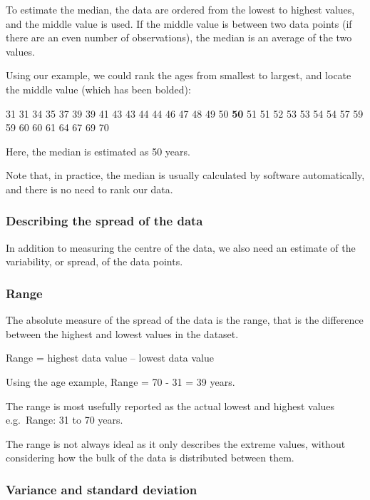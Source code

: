 \documentclass[
  a4paper,
]{memoir}
\begin{document}
To estimate the median, the data are ordered from the lowest to highest
values, and the middle value is used. If the middle value is between two
data points (if there are an even number of observations), the median is
an average of the two values.

Using our example, we could rank the ages from smallest to largest, and
locate the middle value (which has been bolded):

31 31 34 35 37 39 39 41 43 43 44 44 46 47 48 49 50 \textbf{50} 51 51 52
53 53 54 54 57 59 59 60 60 61 64 67 69 70

Here, the median is estimated as 50 years.

Note that, in practice, the median is usually calculated by software
automatically, and there is no need to rank our data.

\hypertarget{describing-the-spread-of-the-data}{%
\subsubsection{Describing the spread of the
data}\label{describing-the-spread-of-the-data}}

In addition to measuring the centre of the data, we also need an
estimate of the variability, or spread, of the data points.

\hypertarget{range}{%
\subsubsection{Range}\label{range}}

The absolute measure of the spread of the data is the range, that is the
difference between the highest and lowest values in the dataset.

Range = highest data value -- lowest data value

Using the age example, Range = 70 - 31 = 39 years.

The range is most usefully reported as the actual lowest and highest
values e.g.~Range: 31 to 70 years.

The range is not always ideal as it only describes the extreme values,
without considering how the bulk of the data is distributed between
them.

\hypertarget{variance-and-standard-deviation}{%
\subsubsection{Variance and standard
deviation}\label{variance-and-standard-deviation}}
\end{document}
